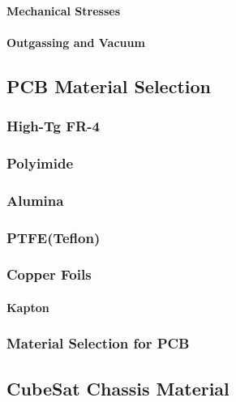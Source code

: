 \paragraph{Mechanical Stresses}   

\paragraph{Outgassing and Vacuum}


\subsection{PCB Material Selection}  %

\subsubsection{High-Tg FR-4}

\subsubsection{Polyimide}

\subsubsection{Alumina}

\subsubsection{PTFE(Teflon)}

\subsubsection{Copper Foils}

\paragraph{Kapton}

\subsubsection{Material Selection for PCB}

\subsection{CubeSat Chassis Material} %

